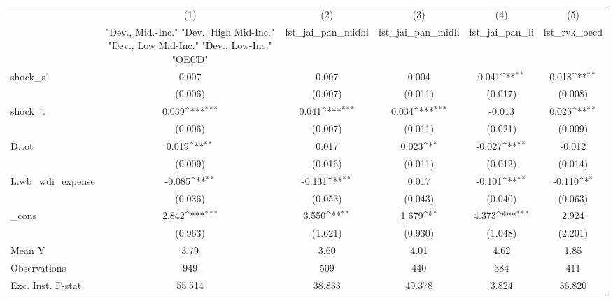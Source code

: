 {
\def\sym#1{\ifmmode^{#1}\else\(^{#1}\)\fi}
\begin{tabular}{l*{5}{c}}
\toprule
            &\multicolumn{1}{c}{(1)}&\multicolumn{1}{c}{(2)}&\multicolumn{1}{c}{(3)}&\multicolumn{1}{c}{(4)}&\multicolumn{1}{c}{(5)}\\
            &\multicolumn{1}{c}{ "Dev., Mid.-Inc." "Dev., High Mid-Inc." "Dev., Low Mid-Inc." "Dev., Low-Inc." "OECD" }&\multicolumn{1}{c}{fst\_jai\_pan\_midhi}&\multicolumn{1}{c}{fst\_jai\_pan\_midli}&\multicolumn{1}{c}{fst\_jai\_pan\_li}&\multicolumn{1}{c}{fst\_rvk\_oecd}\\
\midrule
shock\_s1    &       0.007         &       0.007         &       0.004         &       0.041\sym{**} &       0.018\sym{**} \\
            &     (0.006)         &     (0.007)         &     (0.011)         &     (0.017)         &     (0.008)         \\
\addlinespace
shock\_t     &       0.039\sym{***}&       0.041\sym{***}&       0.034\sym{***}&      -0.013         &       0.025\sym{**} \\
            &     (0.006)         &     (0.007)         &     (0.011)         &     (0.021)         &     (0.009)         \\
\addlinespace
D.tot       &       0.019\sym{**} &       0.017         &       0.023\sym{*}  &      -0.027\sym{**} &      -0.012         \\
            &     (0.009)         &     (0.016)         &     (0.011)         &     (0.012)         &     (0.014)         \\
\addlinespace
L.wb\_wdi\_expense&      -0.085\sym{**} &      -0.131\sym{**} &       0.017         &      -0.101\sym{**} &      -0.110\sym{*}  \\
            &     (0.036)         &     (0.053)         &     (0.043)         &     (0.040)         &     (0.063)         \\
\addlinespace
\_cons      &       2.842\sym{***}&       3.550\sym{**} &       1.679\sym{*}  &       4.373\sym{***}&       2.924         \\
            &     (0.963)         &     (1.621)         &     (0.930)         &     (1.048)         &     (2.201)         \\
\midrule
Mean Y      &        3.79         &        3.60         &        4.01         &        4.62         &        1.85         \\
Observations&         949         &         509         &         440         &         384         &         411         \\
Exc. Inst. F-stat&      55.514         &      38.833         &      49.378         &       3.824         &      36.820         \\
\bottomrule
\end{tabular}
}
